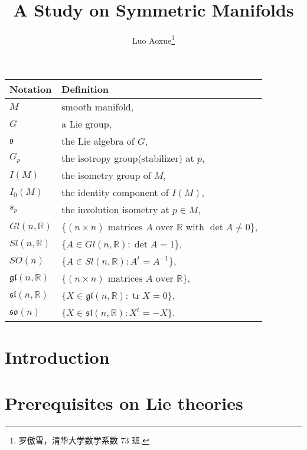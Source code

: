 \documentclass[twoside]{article}
\begin{document}
\title{A Study on Symmetric Manifolds}
\author{Luo Aoxue\footnote{罗傲雪，清华大学数学系数 73 班.}}

\begin{abstract}

\end{abstract}

\tableofcontents
\begin{center}
  \begin{tabular}{ll}
    \hline
    \textbf{Notation}              & \textbf{Definition} \\
    \hline
    $M$                            & smooth manifold,\\
    $G$                            & a Lie group,\\
    ${\mathfrak g}$                         & the Lie algebra of $G$,\\
    $G_p$                          & the isotropy group(stabilizer) at $p$,\\
    $I(M)$                         & the isometry group of $M$,\\
    $I_0(M)$                       & the identity component of $I(M)$,\\
    $s_p$                          & the involution isometry at $p\in M$,\\
    $Gl(n,\mathbb{R})$             & $\{(n\times n) \text{ matrices } A \text{ over } \mathbb{R} \text{ with } \det A\neq 0\}$,\\
    $Sl(n,\mathbb{R})$             & $\{A \in Gl(n,\mathbb{R}) : \det A =1\}$,\\
    $SO(n)$                        & $\{A \in Sl(n,\mathbb{R}) : A^t=A^{-1}\}$,\\
    $\mathfrak {gl}(n,\mathbb{R})$ & $\{(n\times n) \text{ matrices } A \text{ over } \mathbb{R}\}$,\\
    $\mathfrak{sl}(n,\mathbb{R})$  & $\{X \in \mathfrak {gl}(n,\mathbb{R}) : \operatorname{tr} X=0\}$,\\
    $\mathfrak{so}(n)$             & $\{X \in \mathfrak {sl}(n,\mathbb{R}) : X^t=-X\}$. \\
    \hline
  \end{tabular}
\end{center}

\section{Introduction}



\section{Prerequisites on Lie theories}
\end{document}
